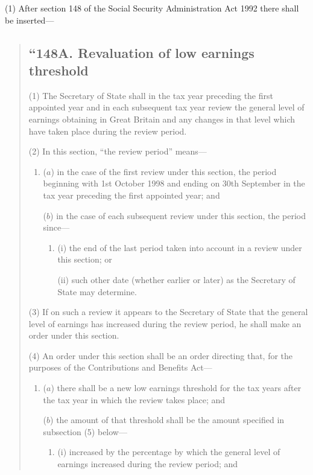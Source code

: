 \documentclass[12pt,a4paper]{article}
\begin{document}
(1) After section 148 of the Social Security Administration Act 1992 there shall be inserted—
\begin{quotation}
\subsection*{“148A. Revaluation of low earnings threshold}

(1) The Secretary of State shall in the tax year preceding the first appointed year and in each subsequent tax year review the general level of earnings obtaining in Great Britain and any changes in that level which have taken place during the review period.

(2) In this section, “the review period” means—
\begin{enumerate}\item[]
($a$) in the case of the first review under this section, the period beginning with 1st October 1998 and ending on 30th September in the tax year preceding the first appointed year; and

($b$) in the case of each subsequent review under this section, the period since—
\begin{enumerate}\item[]
(i) the end of the last period taken into account in a review under this section; or

(ii) such other date (whether earlier or later) as the Secretary of State may determine.
\end{enumerate}
\end{enumerate}

(3) If on such a review it appears to the Secretary of State that the general level of earnings has increased during the review period, he shall make an order under this section.

(4) An order under this section shall be an order directing that, for the purposes of the Contributions and Benefits Act—
\begin{enumerate}\item[]
($a$) there shall be a new low earnings threshold for the tax years after the tax year in which the review takes place; and

($b$) the amount of that threshold shall be the amount specified in subsection (5)  below—
\begin{enumerate}\item[]
(i) increased by the percentage by which the general level of earnings increased during the review period; and


\end{enumerate}
\end{enumerate}
\end{quotation}
\end{document}
